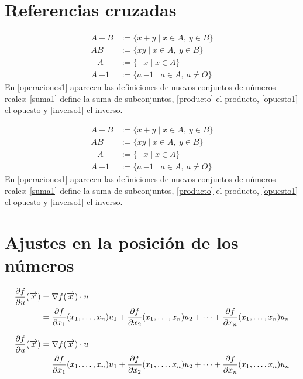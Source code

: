 \documentclass[12pt]{book}
\numberwithin{equation}{section}
\theoremstyle{plain}  %
\begin{document}
\section{Referencias cruzadas}

\begin{verbatim*}
	\begin{subequations}\label{operaciones1}
		\begin{align}
			A+B &:= \{x+y \mid x\in A,\ y\in B\} \label{suma1}\\
			AB &:= \{xy \mid x\in A,\ y\in B\} \label{producto1}\\
			-A &:= \{-x \mid x\in A\} \label{opuesto1}\\
			A~{-1} &:= \{a~{-1} \mid a\in A,\ a\ne O\} \label{inverso1}
		\end{align}
	\end{subequations}
	En \eqref{operaciones1} aparecen las definiciones de nuevos
	conjuntos de números reales: \eqref{suma1} define la suma de
	subconjuntos, \eqref{producto} el producto, \eqref{opuesto1} el
	opuesto y \eqref{inverso1} el inverso.
\end{verbatim*}

\begin{subequations}\label{operaciones1}
	\begin{align}
		A+B &:= \{x+y \mid x\in A,\ y\in B\} \label{suma1}\\
		AB &:= \{xy \mid x\in A,\ y\in B\} \label{producto1}\\
		-A &:= \{-x \mid x\in A\} \label{opuesto1}\\
		A~{-1} &:= \{a~{-1} \mid a\in A,\ a\ne O\} \label{inverso1}
	\end{align}
\end{subequations}
En \eqref{operaciones1} aparecen las definiciones de nuevos
conjuntos de números reales: \eqref{suma1} define la suma de
subconjuntos, \eqref{producto} el producto, \eqref{opuesto1} el
opuesto y \eqref{inverso1} el inverso.

\section{Ajustes en la posición de los números}

\begin{verbatim*}
	\begin{align}
		\parcial{f}{u}(\overrightarrow{x})&=\nabla f(\overrightarrow{x})\cdot u \\ 
		&=\parcial{f}{x_1}(x_1,\ldots,x_n)u_1+\parcial{f}{x_2}(x_1,\ldots,x_n)u_2+\cdots+\parcial{f}{x_n}(x_1,\ldots,x_n)u_n \raisetag{-0.1cm}
	\end{align}
	
	\begin{align}
		\parcial{f}{u}(\overrightarrow{x})&=\nabla f(\overrightarrow{x})\cdot u \\ 
		&=\parcial{f}{x_1}(x_1,\ldots,x_n)u_1+\parcial{f}{x_2}(x_1,\ldots,x_n)u_2+\cdots+\parcial{f}{x_n}(x_1,\ldots,x_n)u_n 
	\end{align}
	
\end{verbatim*}
\end{document}

